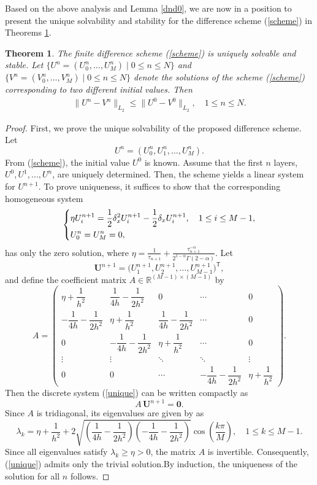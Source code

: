 \documentclass[10pt, reqno]{amsart}
\newtheorem{thm}{\bf Theorem}
\newenvironment{theorem}{\begin{thm}} {\end{thm}}
\theoremstyle{remark}
\theoremstyle{definition}
\numberwithin{table}{section}
\begin{document}
Based on the above analysis and Lemma \ref{dnd0}, we are now in a position to present the unique solvability and stability for the difference scheme (\ref{scheme}) in Theorems \ref{stable}.
\begin{theorem}\label{stable}
The finite difference scheme (\ref{scheme}) is uniquely solvable and stable. Let $\{U^n = (U_0^n, \ldots, U_M^n) \mid 0 \le n \le N\}$ and $\{V^n = (V_0^n, \ldots, V_M^n) \mid 0 \le n \le N\}$ denote the solutions of the scheme (\ref{scheme}) corresponding to two different initial values. Then
\begin{align}
\|U^n-V^n\|_{L_2} \leq \|U^0-V^0\|_{L_2},\quad 1\le n\le N. 
\end{align}
\end{theorem}
\begin{proof}
First, we prove the unique solvability of the proposed difference scheme. Let 
        $$
        U^n=(U_0^n, U_1^n, \ldots, U_M^n). 
        $$
        From (\ref{scheme}), the initial value $U^0$ is known. Assume that the first $n$ layers, $U^0, U^1, \ldots, U^n$, are uniquely determined. Then, the scheme yields a linear system for $U^{n+1}$. To prove uniqueness, it suffices to show that the corresponding homogeneous system 
        \begin{equation}
            \left\{
        \begin{aligned}
        &\eta {U_i^{n+1}}=\frac{1}{2}\delta_x^2U_i^{n+1}-\frac{1}{2}{\delta}_xU_i^{n+1}, \quad1\leq i\leq M-1,\notag\\
        &U_0^n=U_M^n=0 ,\label{unique}
        \end{aligned}
        \right.
        \end{equation}
        has only the zero solution, where $\eta = \frac{1}{\tau_{n+1}} + \frac{\tau_{n+1}^{-\alpha}}{2^{1-\alpha}\Gamma(2-\alpha)}$.
Let
\[
\mathbf{U}^{n+1}
= \big( U_1^{n+1}, U_2^{n+1}, \ldots, U_{M-1}^{n+1} \big)^{\mathsf T},
\]
and define the coefficient matrix $A \in \mathbb{R}^{(M-1)\times(M-1)}$ by
\[
A =
\begin{pmatrix}
\eta+\dfrac{1}{h^2} & \dfrac{1}{4h}-\dfrac{1}{2h^2} & 0 & \cdots & 0 \\
-\dfrac{1}{4h}-\dfrac{1}{2h^2} & \eta+\dfrac{1}{h^2} & \dfrac{1}{4h}-\dfrac{1}{2h^2} & \cdots & 0 \\
0 & -\dfrac{1}{4h}-\dfrac{1}{2h^2} & \eta+\dfrac{1}{h^2} & \cdots & 0 \\
\vdots & \vdots & \ddots & \ddots & \vdots \\
0 & 0 & \cdots & -\dfrac{1}{4h}-\dfrac{1}{2h^2} & \eta+\dfrac{1}{h^2}
\end{pmatrix}.
\]
Then the discrete system (\ref{unique}) can be written compactly as
\[
A \, \mathbf{U}^{n+1} = \mathbf{0}.
\]
Since $A$ is tridiagonal, its eigenvalues are given by \cite{gregory1969} as
$$
\lambda_k=\eta+\frac{1}{h^2}+2\sqrt{(\frac{1}{4h}-\frac{1}{2h^2})(-\frac{1}{4h}-\frac{1}{2h^2})}\cos(\frac{k\pi}{M}),\quad 1\le k\le M-1.
$$
Since all eigenvalues satisfy $\lambda_k \ge \eta > 0$, the matrix $A$ is invertible. Consequently, (\ref{unique}) admits only the trivial solution.By induction, the uniqueness of the solution for all $n$ follows.


\end{proof}
\end{document}
